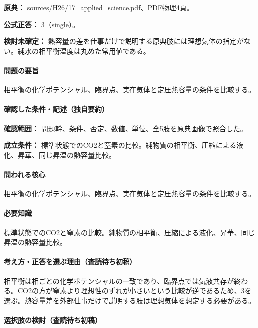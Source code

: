 \noindent\textbf{原典：} sources/H26/17\_applied\_science.pdf、PDF物理4頁。

\textbf{公式正答：} 3（single）。

\par\textbf{検討未確定：} 熱容量の差を仕事だけで説明する原典肢には理想気体の指定がない。純水の相平衡温度は丸めた常用値である。

\paragraph{問題の要旨} 相平衡の化学ポテンシャル、臨界点、実在気体と定圧熱容量の条件を比較する。

\paragraph{確認した条件・記述（独自要約）}\mbox{}\par

\noindent\textbf{確認範囲：} 問題幹、条件、否定、数値、単位、全5肢を原典画像で照合した。\par

\noindent\textbf{成立条件：} 標準状態でのCO2と窒素の比較。純物質の相平衡、圧縮による液化、昇華、同じ昇温の熱容量比較。\par

\paragraph{問われる核心} 相平衡の化学ポテンシャル、臨界点、実在気体と定圧熱容量の条件を比較する。

\paragraph{必要知識} 標準状態でのCO2と窒素の比較。純物質の相平衡、圧縮による液化、昇華、同じ昇温の熱容量比較。

\paragraph{考え方・正答を選ぶ理由（査読待ち初稿）} 相平衡は相ごとの化学ポテンシャルの一致であり、臨界点では気液共存が終わる。CO2の方が窒素より理想性のずれが小さいという比較が逆であるため、3を選ぶ。熱容量差を外部仕事だけで説明する肢は理想気体を想定する必要がある。

\paragraph{選択肢の検討（査読待ち初稿）}\mbox{}\par

